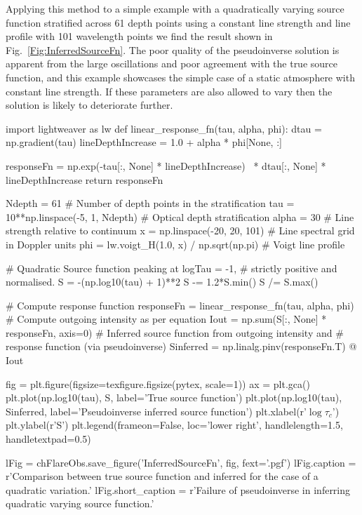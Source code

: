 Applying this method to a simple example with a quadratically varying source function stratified across 61 depth points using a constant line strength and line profile with 101 wavelength points we find the result shown in Fig.~\ref{Fig:InferredSourceFn}.
The poor quality of the pseudoinverse solution is apparent from the large oscillations and poor agreement with the true source function, and this example showcases the simple case of a static atmosphere with constant line strength.
If these parameters are also allowed to vary then the solution is likely to deteriorate further.

\begin{pycode}[FlareObs]
import lightweaver as lw
def linear_response_fn(tau, alpha, phi):
    dtau = np.gradient(tau)
    lineDepthIncrease = 1.0 + alpha * phi[None, :]

    responseFn = np.exp(-tau[:, None] * lineDepthIncrease) \
                  * dtau[:, None] * lineDepthIncrease
    return responseFn

Ndepth = 61 # Number of depth points in the stratification
tau = 10**np.linspace(-5, 1, Ndepth) # Optical depth stratification
alpha = 30 # Line strength relative to continuum
x = np.linspace(-20, 20, 101) # Line spectral grid in Doppler units
phi = lw.voigt_H(1.0, x) / np.sqrt(np.pi) # Voigt line profile

# Quadratic Source function peaking at logTau = -1,
# strictly positive and normalised.
S = -(np.log10(tau) + 1)**2
S -= 1.2*S.min()
S /= S.max()

# Compute response function
responseFn = linear_response_fn(tau, alpha, phi)
# Compute outgoing intensity as per equation
Iout = np.sum(S[:, None] * responseFn, axis=0)
# Inferred source function from outgoing intensity and
# response function (via pseudoinverse)
Sinferred = np.linalg.pinv(responseFn.T) @ Iout

fig = plt.figure(figsize=texfigure.figsize(pytex, scale=1))
ax = plt.gca()
plt.plot(np.log10(tau), S, label='True source function')
plt.plot(np.log10(tau), Sinferred, label='Pseudoinverse inferred source function')
plt.xlabel(r'$\log\tau_c$')
plt.ylabel(r'S')
plt.legend(frameon=False, loc='lower right', handlelength=1.5, handletextpad=0.5)

lFig = chFlareObs.save_figure('InferredSourceFn', fig, fext='.pgf')
lFig.caption = r'Comparison between true source function and inferred for the case of a quadratic variation.'
lFig.short_caption = r'Failure of pseudoinverse in inferring quadratic varying source function.'
\end{pycode}

